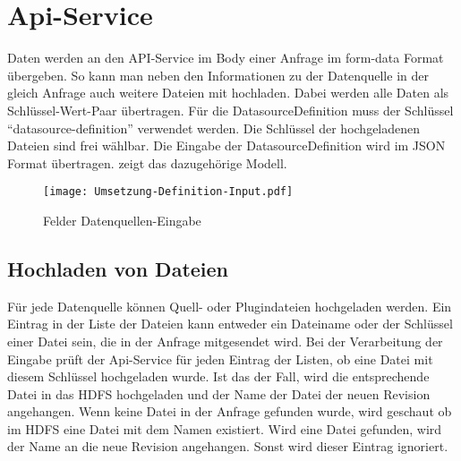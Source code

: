 \section{Api-Service}

Daten werden an den API-Service im Body einer Anfrage im form-data Format übergeben.
So kann man neben den Informationen zu der Datenquelle in der gleich Anfrage auch weitere Dateien mit hochladen.
Dabei werden alle Daten als Schlüssel-Wert-Paar übertragen.
Für die DatasourceDefinition muss der Schlüssel "`datasource-definition"' verwendet werden.
Die Schlüssel der hochgeladenen Dateien sind frei wählbar.
Die Eingabe der DatasourceDefinition wird im JSON Format übertragen.
 zeigt das dazugehörige Modell.

\begin{figure}
    \centering
    \texttt{[image: Umsetzung-Definition-Input.pdf]}
    \caption{Felder Datenquellen-Eingabe}
    \label{fig:datasource-definition-input}
\end{figure}

\subsection{Hochladen von Dateien}

Für jede Datenquelle können Quell- oder Plugindateien hochgeladen werden.
Ein Eintrag in der Liste der Dateien kann entweder ein Dateiname oder der Schlüssel einer Datei sein, die in der Anfrage mitgesendet wird.
Bei der Verarbeitung der Eingabe prüft der Api-Service für jeden Eintrag der Listen, ob eine Datei mit diesem Schlüssel hochgeladen wurde.
Ist das der Fall, wird die entsprechende Datei in das HDFS hochgeladen und der Name der Datei der neuen Revision angehangen.
Wenn keine Datei in der Anfrage gefunden wurde, wird geschaut ob im HDFS eine Datei mit dem Namen existiert.
Wird eine Datei gefunden, wird der Name an die neue Revision angehangen.
Sonst wird dieser Eintrag ignoriert.
